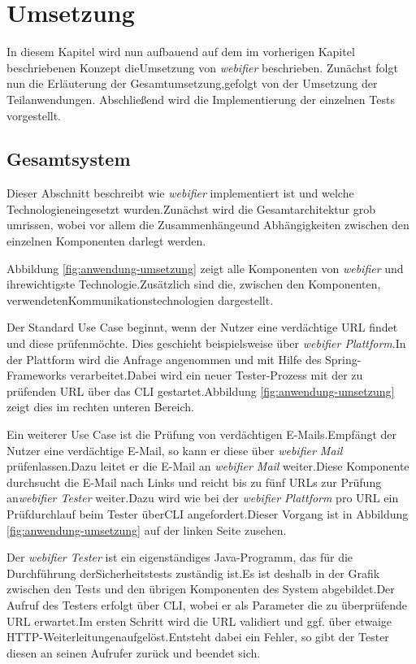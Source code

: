 \chapter{Umsetzung}

In diesem Kapitel wird nun aufbauend auf dem im vorherigen Kapitel beschriebenen Konzept dieUmsetzung von \textit{webifier} beschrieben. Zunächst folgt nun die Erläuterung der Gesamtumsetzung,gefolgt von der Umsetzung der Teilanwendungen. Abschließend wird die Implementierung der einzelnen Tests vorgestellt.

\section{Gesamtsystem}

Dieser Abschnitt beschreibt wie \textit{webifier} implementiert ist und welche Technologieneingesetzt wurden.Zunächst wird die Gesamtarchitektur grob umrissen, wobei vor allem die Zusammenhängeund Abhängigkeiten zwischen den einzelnen Komponenten darlegt werden.

Abbildung \ref{fig:anwendung-umsetzung} zeigt alle Komponenten von \textit{webifier} und ihrewichtigste Technologie.Zusätzlich sind die, zwischen den Komponenten, verwendetenKommunikationstechnologien dargestellt.

Der Standard Use Case beginnt, wenn der Nutzer eine verdächtige \acs{URL} findet und diese prüfenmöchte. Dies geschieht beispielsweise über \textit{webifier Plattform}.In der Plattform wird die Anfrage angenommen und mit Hilfe des Spring-Frameworks verarbeitet.Dabei wird ein neuer Tester-Prozess mit der zu prüfenden \acs{URL} über das \ac{CLI} gestartet.Abbildung \ref{fig:anwendung-umsetzung} zeigt dies im rechten unteren Bereich.

Ein weiterer Use Case ist die Prüfung von verdächtigen E-Mails.Empfängt der Nutzer eine verdächtige E-Mail, so kann er diese über \textit{webifier Mail} prüfenlassen.Dazu leitet er die E-Mail an \textit{webifier Mail} weiter.Diese Komponente durchsucht die E-Mail nach Links und reicht bis zu fünf \acsp{URL} zur Prüfung an\textit{webifier Tester} weiter.Dazu wird wie bei der \textit{webifier Plattform} pro \acs{URL} ein Prüfdurchlauf beim Tester über\ac{CLI} angefordert.Dieser Vorgang ist in Abbildung \ref{fig:anwendung-umsetzung} auf der linken Seite zusehen.

Der \textit{webifier Tester} ist ein eigenständiges Java-Programm, das für die Durchführung derSicherheitstests zuständig ist.Es ist deshalb in der Grafik zwischen den Tests und den übrigen Komponenten des System abgebildet.Der Aufruf des Testers erfolgt über \ac{CLI}, wobei er als Parameter die zu überprüfende \acs{URL} erwartet.Im ersten Schritt wird die \acs{URL} validiert und ggf. über etwaige \acs{HTTP}-Weiterleitungenaufgelöst.Entsteht dabei ein Fehler, so gibt der Tester diesen an seinen Aufrufer zurück und beendet sich.

